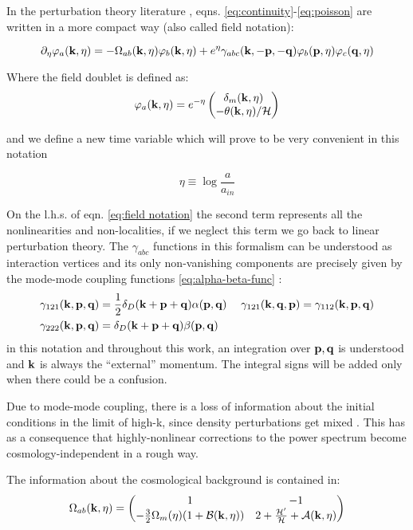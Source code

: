 In the perturbation theory literature \cite{bernardeau_large-scale_2001,crocce_renormalized_2005,pietroni_flowing_2008},
eqns. \ref{eq:continuity}-\ref{eq:poisson} are written in a more
compact way (also called field notation):

\begin{equation}
\partial_{\eta}\varphi_{a}(\mathbf{k},\eta)=-\Omega_{ab}(\mathbf{k},\eta)\varphi_{b}(\mathbf{k},\eta)+e^{\eta}\gamma_{abc}(\mathbf{k},\mathbf{-p},\mathbf{-q})\varphi_{b}(\mathbf{p},\eta)\varphi_{c}(\mathbf{q},\eta)\label{eq:field notation}
\end{equation}


Where the field doublet is defined as: 
\begin{equation}
\varphi_{a}(\mathbf{k},\eta)=e^{-\eta}\begin{pmatrix}\delta_{m}(\mathbf{k},\eta)\\ -\theta(\mathbf{k},\eta)/\mathcal{H} \end{pmatrix}\label{eq:field-doublet}
\end{equation}


and we define a new time variable which will prove to be very convenient
in this notation

\[
\eta\equiv\log\frac{a}{a_{in}}
\]


On the l.h.s. of eqn. \ref{eq:field notation} the second term represents
all the nonlinearities and non-localities, if we neglect this term
we go back to linear perturbation theory. The $\gamma_{abc}$ functions
in this formalism can be understood as interaction vertices and its
only non-vanishing components are precisely given by the mode-mode
coupling functions \ref{eq:alpha-beta-func} : 
\begin{align}
\gamma_{121}(\mathbf{k},\mathbf{p},\mathbf{q}) & =\frac{1}{2}\delta_{D}(\mathbf{k}+\mathbf{p}+\mathbf{q})\alpha(\mathbf{p},\mathbf{q}) & \;\gamma_{121}(\mathbf{k},\mathbf{q},\mathbf{p})=\gamma_{112}(\mathbf{k},\mathbf{p},\mathbf{q})\label{eq:coupling-vertices}\\
\gamma_{222}(\mathbf{k},\mathbf{p},\mathbf{q}) & =\delta_{D}(\mathbf{k}+\mathbf{p}+\mathbf{q})\beta(\mathbf{p},\mathbf{q})\nonumber 
\end{align}
in this notation and throughout this work, an integration over $\mathbf{p},\mathbf{q}$
is understood and $\mathbf{k}$ is always the ``external'' momentum.
The integral signs will be added only when there could be a confusion.

Due to mode-mode coupling, there is a loss of information about the
initial conditions in the limit of high-k, since density perturbations
get mixed \cite{crocce_memory_2006}. This has as a consequence that
highly-nonlinear corrections to the power spectrum become cosmology-independent
in a rough way.

The information about the cosmological background is contained in:
\begin{equation}
\Omega_{ab}(\mathbf{k},\eta)=\begin{pmatrix}1 & -1\\
-\frac{3}{2}\Omega_{m}(\eta)(1+\mathcal{B}(\mathbf{k},\eta)) & 2+\frac{\mathcal{H}'}{\mathcal{H}}+\mathcal{A}(\mathbf{k},\eta)
\end{pmatrix}\label{eq:general-Omega-Matrix}
\end{equation}


